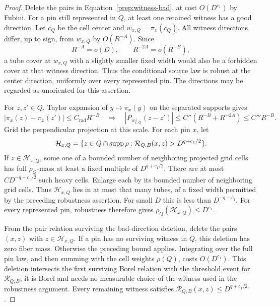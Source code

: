 \begin{proof}
Delete the pairs in Equation~\eqref{prep:witness-bad}, at cost
$O(D^{c_1})$ by Fubini. For a pin still represented in $Q$, at least
one retained witness has a good direction. Let $c_Q$ be the cell center
and $w_{x,Q}=\pi_x(c_Q)$. All witness directions differ, up to sign,
from $w_{x,Q}$ by $O(R^{-A})$. Since
\begin{equation}\label{prep:linearization-margin}
 R^{-A}=o(D),\qquad R^{-2A}=o(R^{-B}),
\end{equation}
a tube cover at $w_{x,Q}$ with a slightly smaller fixed width would
also be a forbidden cover at that witness direction. Thus the
conditional source law is robust at the center direction, uniformly
over every represented pin. The directions may be regarded as
unoriented for this assertion.

For $z,z'\in Q$, Taylor expansion of $y\mapsto\pi_x(y)$ on the
separated supports gives
\[
 |\pi_x(z)-\pi_x(z')|\le C_{\mathrm{rad}}R^{-B}
 \quad\Longrightarrow\quad
 |P_{w_{x,Q}^{\perp}}(z-z')|
 \le C''(R^{-B}+R^{-2A})\le C'''R^{-B}.
\]
Grid the perpendicular projection at this scale. For each pin $x$, let
\[
 \mathcal H_{x,Q}
 =\{z\in Q\cap\operatorname{supp}\rho:\mathcal R_{Q,B}(x,z)>D^{q+c_1/2}\}.
\]
If $z\in\mathcal H_{x,Q}$, some one of a bounded number of neighboring
projected grid cells has full $\rho_Q$-mass at least a fixed multiple
of $D^{q+c_1/2}$. There are at most $C D^{-q-c_1/2}$ such heavy
cells. Enlarge each by its bounded number of neighboring grid cells.
Thus $\mathcal H_{x,Q}$ lies in at most that many tubes, of a fixed
width permitted by the preceding robustness assertion. For small $D$
this is less than $D^{-q-c_1}$. For every represented pin, robustness
therefore gives $\rho_Q(\mathcal H_{x,Q})\le D^{c_1}$.

From the pair relation surviving the bad-direction deletion, delete
the pairs $(x,z)$ with $z\in\mathcal H_{x,Q}$. If a pin has no surviving
witness in $Q$, this deletion has zero fiber mass. Otherwise the preceding
bound applies. Integrating over the full pin law, and then summing
with the cell weights $\rho(Q)$, costs $O(D^{c_1})$. This deletion
intersects the first surviving Borel relation with the threshold event
for $\mathcal R_{Q,B}$; it is Borel and needs no measurable choice of
the witness used in the robustness argument. Every remaining witness
satisfies $\mathcal R_{Q,B}(x,z)\le D^{q+c_1/2}$.


\end{proof}
